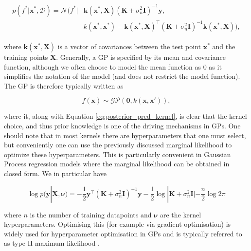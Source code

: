 \begin{align}
\begin{split}
    p(f^*|\mathbf{x}^*, \mathcal{D}) = \mathcal{N}(f^*\big|&\mathbf{k}(\mathbf{x}^*,\mathbf{X})(\mathbf{K}+\sigma_n^2\mathbf{I})^{-1}\mathbf{y}, \\
    &k(\mathbf{x}^*,\mathbf{x}^*)-\mathbf{k}(\mathbf{x}^*,\mathbf{X})^\top(\mathbf{K}+\sigma_n^2\mathbf{I})^{-1}\mathbf{k}(\mathbf{x}^*,\mathbf{X})),
    \label{eq:posterior_pred_kernel}
\end{split}
\end{align}

\noindent where $\mathbf{k}(\mathbf{x}^*,\mathbf{X})$ is a vector of covariances between the test point $\mathbf{x}^*$ and the training points $\mathbf{X}$. Generally, a GP is specified by its mean and covariance function, although we often choose to model the mean function as $0$ as it simplifies the notation of the model (and does not restrict the model function). The GP is therefore typically written as

\begin{equation}
    f(\mathbf{x}) \sim \mathcal{GP}\left(\mathbf{0}, k(\mathbf{x}, \mathbf{x}')\right),
\end{equation}

\noindent where it, along with Equation \ref{eq:posterior_pred_kernel}, is clear that the kernel choice, and thus prior knowledge is one of the driving mechanisms in GPs. One should note that in most kernels there are hyperparameters that one must select, but conveniently one can use the previously discussed marginal likelihood to optimize these hyperparameters. This is particularly convenient in Gaussian Process regression models where the marginal likelihood can be obtained in closed form. We in particular have

\begin{equation}
    \log p(\mathbf{y}|\mathbf{X}, \bm{\nu})=-\frac{1}{2}\mathbf{y}^\top(\mathbf{K}+\sigma_n^2\mathbf{I})^{-1}\mathbf{y}-\frac{1}{2}\log|\mathbf{K}+\sigma_n^2\mathbf{I}|-\frac{n}{2}\log 2\pi
\end{equation}

\noindent where $n$ is the number of training datapoints and $\bm{\nu}$ are the kernel hyperparameters. Optimising this (for example via gradient optimisation) is widely used for hyperparameter optimisation in GPs and is typically referred to as type II maximum likelihood \citep{Rasmussen2006Gaussian}.\\

